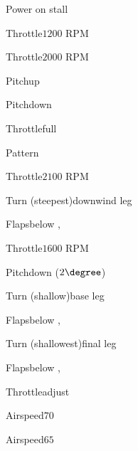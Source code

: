 \begin{multicols}{2}
\begin{checklist}{Power on stall}
  \item{Throttle}{$1200$ RPM}
  \item{Throttle}{$2000$ RPM}
  \item{Pitch}{up}
  \item{Pitch}{down}
  \item{Throttle}{full}
\end{checklist}

\begin{checklist}{Pattern}
  \item{Throttle}{$2100$ RPM}

  \vspace{0.1em}
  \item{Turn (steepest)}{downwind leg}

  \vspace{0.1em}
  \item{Flaps}{below \vfe, \flapsfirstnotch}

  \vspace{0.1em}
  \item{Throttle}{$1600$ RPM}
  \item{Pitch}{down ($2\degree$)}

  \vspace{0.1em}
  \item{Turn (shallow)}{base leg}

  \vspace{0.1em}
  \item{Flaps}{below \vfe, \flapssecondnotch}
  \item{Turn (shallowest)}{final leg}

  \vspace{0.1em}
  \item{Flaps}{below \vfe, \flapsthirdnotch}
  \item{Throttle}{adjust}
  \item{Airspeed}{$70$}

  \vspace{0.1em}
  \item{Airspeed}{$65$}

  \vspace{0.1em}
\end{checklist}

\end{multicols}

